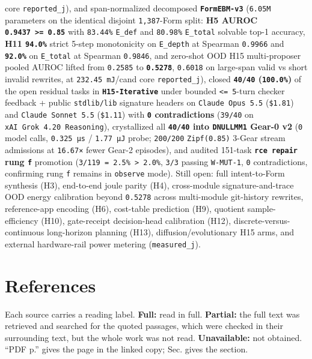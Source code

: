\documentclass[10pt,letterpaper]{article}
\begin{document}
core \texttt{reported\_\allowbreak{}j}), and span-normalized decomposed
\textbf{\texttt{FormEBM-\allowbreak{}v3}} (\texttt{6.05M} parameters on the identical
disjoint \texttt{1,387}-Form split: \textbf{H5 AUROC
\texttt{0.9437\ \textgreater{}=\ 0.85}} with \texttt{83.44\%}
\texttt{E\_def} and \texttt{80.98\%} \texttt{E\_total} solvable top-1
accuracy, \textbf{H11 \texttt{94.0\%}} strict 5-step monotonicity on
\texttt{E\_depth} at Spearman \texttt{0.9966} and
\textbf{\texttt{92.0\%}} on \texttt{E\_total} at Spearman
\texttt{0.9846}, and zero-shot OOD H15 multi-proposer pooled AUROC
lifted from \texttt{0.2585} to \textbf{\texttt{0.5278}}, \texttt{0.6018}
on large-span valid vs short invalid rewrites, at
\texttt{232.\allowbreak{}45\ mJ}/cand core \texttt{reported\_\allowbreak{}j}), closed
\textbf{\texttt{40/40} (\texttt{100.0\%})} of the open residual tasks in
\textbf{\texttt{H15-\allowbreak{}Iterative}} under bounded
\texttt{\textless{}=\ 5}-turn checker feedback + public
\texttt{stdlib/\allowbreak{}lib} signature headers on \texttt{Claude\ Opus\ 5.\allowbreak{}5}
(\texttt{\$1.81}) and \texttt{Claude\ Sonnet\ 5.\allowbreak{}5} (\texttt{\$1.11})
with \textbf{\texttt{0} contradictions} (\texttt{39/40} on
\texttt{xAI\ Grok\ 4.\allowbreak{}20\ Reasoning}), crystallized all
\textbf{\texttt{40/40} into \texttt{DNULLMM1} Gear-0 v2} (\texttt{0}
model calls, \texttt{0.325\ µs} / \texttt{1.77\ µJ} probe;
\texttt{200/200} \texttt{Zipf(\allowbreak{}0.\allowbreak{}85)} 3-Gear stream admissions at
\texttt{16.67×} fewer Gear-2 episodes), and audited 151-task
\textbf{\texttt{rce\ repair} rung \texttt{f}} promotion
(\texttt{3/119\ =\ 2.5\%\ \textgreater{}\ 2.0\%}, \texttt{3/3} passing
\texttt{W-MUT-1}, \texttt{0} contradictions, confirming rung \texttt{f}
remains in \texttt{observe} mode). Still open: full intent-to-Form
synthesis (H3), end-to-end joule parity (H4), cross-module
signature-and-trace OOD energy calibration beyond \texttt{0.5278} across
multi-module git-history rewrites, reference-app encoding (H6),
cost-table prediction (H9), quotient sample-efficiency (H10),
gate-receipt decision-head calibration (H12), discrete-versus-continuous
long-horizon planning (H13), diffusion/evolutionary H15 arms, and
external hardware-rail power metering (\texttt{measured\_\allowbreak{}j}).

\section{References}\label{references}

Each source carries a reading label. \textbf{Full:} read in full.
\textbf{Partial:} the full text was retrieved and searched for the
quoted passages, which were checked in their surrounding text, but the
whole work was not read. \textbf{Unavailable:} not obtained. ``PDF p.''
gives the page in the linked copy; Sec. gives the section.
\end{document}

